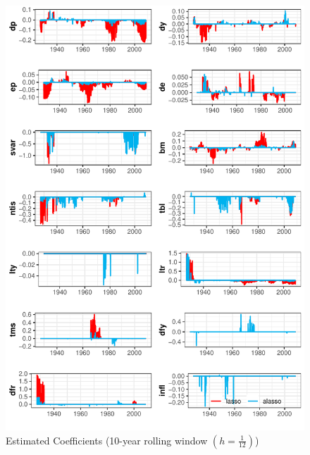 \documentclass[12pt,a4paper]{article}
\begin{document}
\begin{figure}
\begin{center}
		\caption{Estimated Coefficients (10-year rolling window $ (h = \frac{1}{12}) $)}
		\label{fig:3} 
		\includegraphics[scale = 0.96]{selection_graph_h1-2.pdf}
\end{center}
\end{figure}
\end{document}
